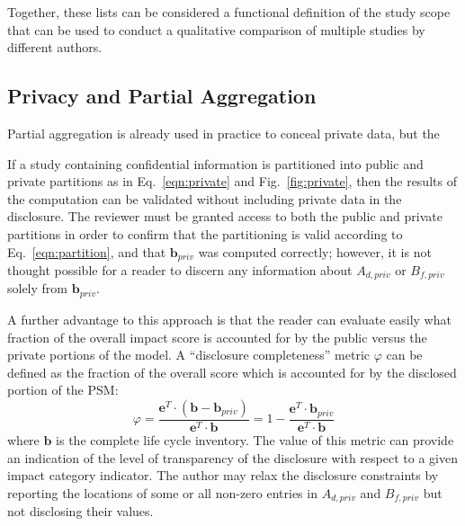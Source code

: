 Together, these lists can be considered a functional definition of the study scope that can be used to conduct a qualitative comparison of multiple studies by different authors.  



\subsection{Privacy and Partial Aggregation} 

Partial aggregation is already used in practice to conceal private data, but the

If a study containing confidential information is partitioned into public and private partitions as in Eq.~\ref{eqn:private} and Fig.~\ref{fig:private}, then the results of the computation can be validated without including private data in the disclosure.  The reviewer must be granted access to both the public and private partitions in order to confirm that the partitioning is valid according to Eq.~\ref{eqn:partition}, and that $\mathbf{b}_{priv}$ was computed correctly; however, it is not thought possible for a reader to discern any information about $A_{d,priv}$ or $B_{f,priv}$ solely from $\mathbf{b}_{priv}$.

A further advantage to this approach is that the reader can evaluate easily what fraction of the overall impact score is accounted for by the public versus the private portions of the model.  A ``disclosure completeness'' metric $\varphi$ can be defined as the fraction of the overall score which is accounted for by the disclosed portion of the PSM:
\begin{equation}
  \varphi =  \frac{\mathbf{e}^T\cdot(\mathbf{b} - \mathbf{b}_{priv})}{\mathbf{e}^T\cdot\mathbf{b}} = 1 - \frac{\mathbf{e}^T\cdot\mathbf{b}_{priv}}{\mathbf{e}^T\cdot\mathbf{b}}
  \label{eqn:metric}
\end{equation}
where $\mathbf{b}$ is the complete life cycle inventory.  The value of this metric can provide an indication of the level of transparency of the disclosure with respect to a given impact category indicator.  The author may relax the disclosure constraints by reporting the locations of some or all non-zero entries in $A_{d,priv}$ and $B_{f,priv}$ but not disclosing their values.








